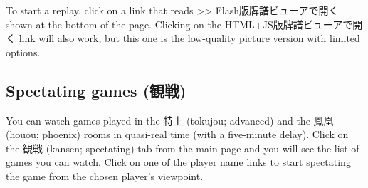 \bigskip
To start a replay, click on a link that reads >> Flash版牌譜ビューアで開く shown at the bottom of the page. Clicking on the HTML+JS版牌譜ビューアで開く link will also work, but this one is the low-quality picture version with limited options. 

\bigskip
\subsection{Spectating games (観戦)}
You can watch games played in the 特上 ({\jap tokujou}; advanced) and the 鳳凰 ({\jap houou}; phoenix) rooms in quasi-real time (with a five-minute delay). Click on the 観戦 ({\jap kansen}; spectating) tab from the main page and you will see the list of games you can watch. Click on one of the player name links to start spectating the game from the chosen player's viewpoint. 

\newpage
\thispagestyle{empty}
\mbox{}\newpage
